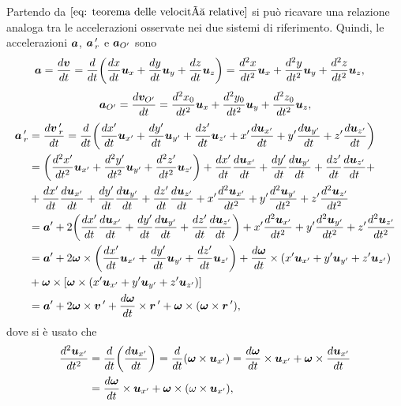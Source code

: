 Partendo da $\eqref{eq: teorema delle velocità relative}$ si può ricavare una relazione analoga tra le accelerazioni osservate nei due sistemi di riferimento. Quindi, le accelerazioni $\bm{a}$, $\bm{a}\,'_r$ e $\bm{a}_{O'}$ sono
\begin{equation}
    \begin{split}
        \bm{a}&=\frac{d\bm{v}}{dt}=\frac{d}{dt}\bigg(\frac{dx}{dt}\bm{u}_x+\frac{dy}{dt}\bm{u}_y+\frac{dz}{dt}\bm{u}_z\bigg)=\frac{d^2x}{dt^2}\bm{u}_x+\frac{d^2y}{dt^2}\bm{u}_y+\frac{d^2z}{dt^2}\bm{u}_z,
    \end{split}
\end{equation}
\begin{equation}
    \bm{a}_{O'}=\frac{d\bm{v}_{O'}}{dt  }=\frac{d^2x_0}{dt^2}\bm{u}_x+\frac{d^2y_0}{dt^2}\bm{u}_y+\frac{d^2z_0}{dt^2}\bm{u}_z,
\end{equation}
\begin{equation}
    \begin{split}
        \bm{a}\,'_r&=\frac{d\bm{v}\,'_r}{dt}=\frac{d}{dt}\bigg(\frac{d{x'}}{dt}\bm{u}_{x'}+\frac{d{y'}}{dt}\bm{u}_{y'}+\frac{d{z'}}{dt}\bm{u}_{z'}+{x'}\frac{d\bm{u}_{x'}}{dt}+{y'}\frac{d\bm{u}_{y'}}{dt}+{z'}\frac{d\bm{u}_{z'}}{dt}\bigg) \\
        &=\bigg(\frac{d^2{x'}}{dt^2}\bm{u}_{x'}+\frac{d^2{y'}}{dt^2}\bm{u}_{y'}+\frac{d^2{z'}}{dt^2}\bm{u}_{z'}\bigg)+\frac{d{x'}}{dt}\frac{d\bm{u}_{x'}}{dt}+\frac{d{y'}}{dt}\frac{d\bm{u}_{y'}}{dt}+\frac{d{z'}}{dt}\frac{d\bm{u}_{z'}}{dt}+ \\
        &+\frac{d{x'}}{dt}\frac{d\bm{u}_{x'}}{dt}+\frac{d{y'}}{dt}\frac{d\bm{u}_{y'}}{dt}+\frac{d{z'}}{dt}\frac{d\bm{u}_{z'}}{dt}+{x'}\frac{d^2\bm{u}_{x'}}{dt^2}+{y'}\frac{d^2\bm{u}_{y'}}{dt^2}+{z'}\frac{d^2\bm{u}_{z'}}{dt^2} \\
        &=\bm{a}'+2\bigg(\frac{d{x'}}{dt}\frac{d\bm{u}_{x'}}{dt}+\frac{d{y'}}{dt}\frac{d\bm{u}_{y'}}{dt}+\frac{d{z'}}{dt}\frac{d\bm{u}_{z'}}{dt}\bigg)+{x'}\frac{d^2\bm{u}_{x'}}{dt^2}+{y'}\frac{d^2\bm{u}_{y'}}{dt^2}+{z'}\frac{d^2\bm{u}_{z'}}{dt^2} \\
        &=\bm{a}'+2\bm{\omega}\times\bigg(\frac{d{x'}}{dt}\bm{u}_{x'}+\frac{d{y'}}{dt}\bm{u}_{y'}+\frac{d{z'}}{dt}\bm{u}_{z'}\bigg)+\frac{d\bm{\omega}}{dt}\times({x'}\bm{u}_{x'}+{y'}\bm{u}_{y'}+{z'}\bm{u}_{z'}) \\
        &+\bm{\omega}\times[\bm{\omega}\times({x'}\bm{u}_{x'}+{y'}\bm{u}_{y'}+{z'}\bm{u}_{z'})]\\
        &=\bm{a}'+2\bm{\omega}\times\bm{v}\,'+\frac{d\bm{\omega}}{dt}\times\bm{r}\,'+\bm{\omega}\times(\bm{\omega}\times\bm{r}\,'),
    \end{split}
\end{equation}
dove si è usato che
\begin{equation}
    \begin{split}
        \frac{d^2\bm{u}_{x'}}{dt^2}&=\frac{d}{dt}\bigg(\frac{d\bm{u}_{x'}}{dt}\bigg)=\frac{d}{dt}(\bm{\omega}\times\bm{u}_{x'})=\frac{d\bm{\omega}}{dt}\times\bm{u}_{x'}+\bm{\omega}\times\frac{d\bm{u}_{x'}}{dt} \\
        &=\frac{d\bm{\omega}}{dt}\times\bm{u}_{x'}+\bm{\omega}\times(\omega\times\bm{u}_{x'}),
    \end{split} 
\end{equation}
